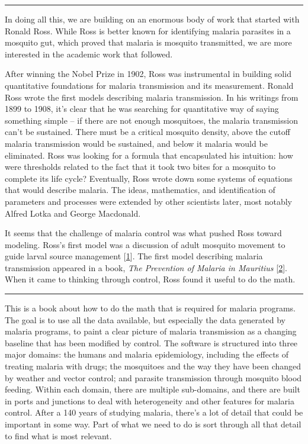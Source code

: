\documentclass[
]{book}
\begin{document}
\begin{center}\rule{0.5\linewidth}{0.5pt}\end{center}

In doing all this, we are building on an enormous body of work that started with Ronald Ross. While Ross is better known for identifying malaria parasites in a mosquito gut, which proved that malaria is mosquito transmitted, we are more interested in the academic work that followed.

After winning the Nobel Prize in 1902, Ross was instrumental in building solid quantitative foundations for malaria transmission and its measurement. Ronald Ross wrote the first models describing malaria transmission. In his writings from 1899 to 1908, it's clear that he was searching for quantitative way of saying something simple -- if there are not enough mosquitoes, the malaria transmission can't be sustained. There must be a critical mosquito density, above the cutoff malaria transmission would be sustained, and below it malaria would be eliminated. Ross was looking for a formula that encapsulated his intuition: how were thresholds related to the fact that it took two bites for a mosquito to complete its life cycle? Eventually, Ross wrote down some systems of equations that would describe malaria. The ideas, mathematics, and identification of parameters and processes were extended by other scientists later, most notably Alfred Lotka and George Macdonald.

It seems that the challenge of malaria control was what pushed Ross toward modeling. Ross's first model was a discussion of adult mosquito movement to guide larval source management {[}\protect\hyperlink{ref-RossR1905LogicalBasis}{1}{]}. The first model describing malaria transmission appeared in a book, \emph{The Prevention of Malaria in Mauritius} {[}\protect\hyperlink{ref-RossR1908ReportPrevention}{2}{]}. When it came to thinking through control, Ross found it useful to do the math.

\begin{center}\rule{0.5\linewidth}{0.5pt}\end{center}

This is a book about how to do the math that is required for malaria programs. The goal is to use all the data available, but especially the data generated by malaria programs, to paint a clear picture of malaria transmission as a changing baseline that has been modified by control. The software is structured into three major domains: the humans and malaria epidemiology, including the effects of treating malaria with drugs; the mosquitoes and the way they have been changed by weather and vector control; and parasite transmission through mosquito blood feeding. Within each domain, there are multiple sub-domains, and there are built in ports and junctions to deal with heterogeneity and other features for malaria control. After a 140 years of studying malaria, there's a lot of detail that could be important in some way. Part of what we need to do is sort through all that detail to find what is most relevant.
\end{document}
